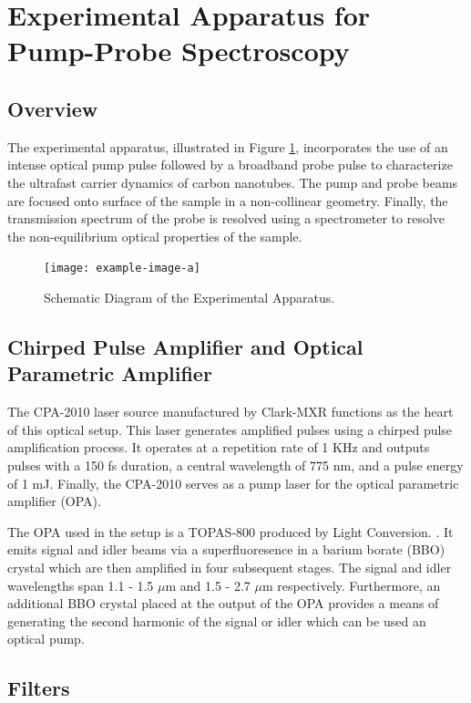 \section{Experimental Apparatus for Pump-Probe Spectroscopy}

\subsection{Overview}
The experimental apparatus, illustrated in Figure \ref{fig:setup_schematic}, incorporates the use of an intense optical pump pulse followed by a broadband probe pulse to characterize the ultrafast carrier dynamics of carbon nanotubes. The pump and probe beams are focused onto surface of the sample in a non-collinear geometry. Finally, the transmission spectrum of the probe is resolved using a spectrometer to resolve the non-equilibrium optical properties of the sample.  


\begin{figure}[h]
	\centering
	\texttt{[image: example-image-a]}
	\caption{ Schematic Diagram of the Experimental Apparatus. }
	\label{fig:setup_schematic}
\end{figure}


\subsection{Chirped Pulse Amplifier and Optical Parametric Amplifier}
The CPA-2010 laser source manufactured by Clark-MXR functions as the heart of this optical setup. This laser generates amplified pulses using a chirped pulse amplification process. It operates at a repetition rate of 1 KHz and outputs pulses with a 150 fs duration, a central wavelength of 775 nm, and a pulse energy of 1 mJ. Finally, the CPA-2010 serves as a pump laser for the optical parametric amplifier (OPA). 

The OPA used in the setup is a TOPAS-800 produced by Light Conversion. \cite{topas}. It emits signal and idler beams via a superfluoresence in a barium borate (BBO) crystal which are then amplified in four subsequent stages. The signal and idler wavelengths span 1.1 - 1.5 $\mu$m  and 1.5 - 2.7 $\mu$m respectively. Furthermore, an additional BBO crystal placed at the output of the OPA provides a means of generating the second harmonic of the signal or idler which can be used an optical pump.

\subsection{Filters}

